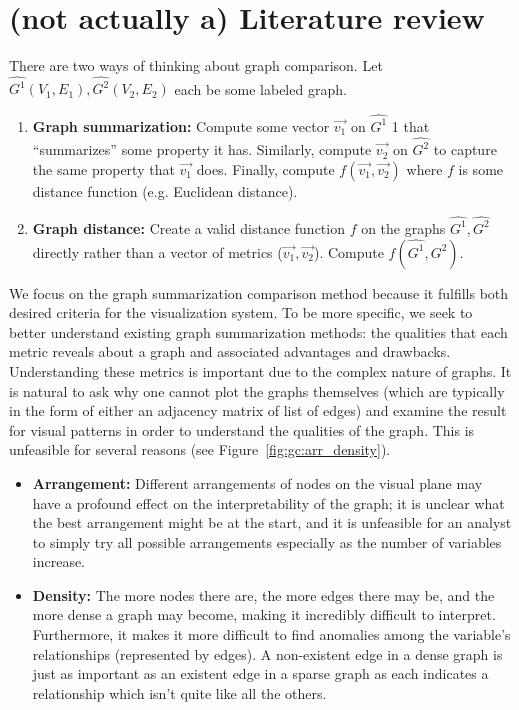 \section{(not actually a) Literature review}
\label{sec:gc:litreview}

There are two ways of thinking about graph comparison. Let $\hat{G^1}(V_1,E_1), 
\hat{G^2}(V_2,E_2)$ each be some labeled graph. 

\tablespacing
\begin{enumerate}
	\item \textbf{Graph summarization:} Compute some vector 
	$\overrightarrow{v_1}$ on $\hat{G^1}$ 1 that ``summarizes'' some property 
	it has. Similarly, compute $\overrightarrow{v_2}$ on $\hat{G^2}$ to capture 
	the same property that $\overrightarrow{v_1}$ does. Finally, compute 
	$f(\overrightarrow{v_1},\overrightarrow{v_2})$ where $f$ is some distance 
	function (e.g. Euclidean distance).
	\item \textbf{Graph distance:} Create a valid distance function $f$ on the 
	graphs $\hat{G^1}, \hat{G^2}$ directly rather than a vector of metrics 
	($\overrightarrow{v_1},\overrightarrow{v_2}$). 
	Compute $f(\hat{G^1},\hat{G^2})$.
\end{enumerate}
\bodyspacing

We focus on the graph summarization comparison method because it fulfills both 
desired criteria for the visualization system. To be more specific, we seek to 
better understand existing graph summarization methods: the qualities that each 
metric reveals about a graph and associated advantages and drawbacks. 
Understanding these metrics is important due to the complex nature of graphs.
It is natural to ask why one cannot plot the graphs themselves (which are 
typically in the form of either an adjacency matrix of list of edges) and 
examine the result for visual patterns in order to understand the qualities 
of the graph. This is unfeasible for several reasons (see 
Figure~\ref{fig:gc:arr_density}). 

\tablespacing
\begin{itemize}
	\item \textbf{Arrangement:} Different arrangements of nodes on the visual 
	plane may have a profound effect on the interpretability of the graph; it 
	is unclear what the best arrangement might be at the start, and it is 
	unfeasible for an analyst to simply try all possible arrangements 
	especially as the number of variables increase.
	\item \textbf{Density:} The more nodes there are, the more edges there may 
	be, and the more dense a graph may become, making it incredibly difficult 
	to interpret. Furthermore, it makes it more difficult to find anomalies 
	among the variable's relationships (represented by edges). A non-existent 
	edge in a dense graph is just as important as an existent edge in a sparse 
	graph as each indicates a relationship which isn't quite like all the 
	others.
\end{itemize}
\bodyspacing

